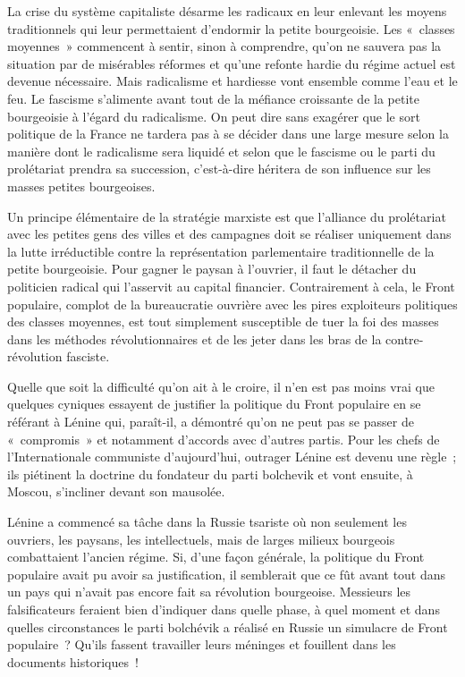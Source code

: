 \documentclass[french,twoside]{book} %
\begin{document}
La crise du système capitaliste désarme les radicaux en leur enlevant les moyens traditionnels qui leur permettaient d’endormir la petite bourgeoisie. Les « classes moyennes » commencent à sentir, sinon à comprendre, qu’on ne sauvera pas la situation par de misérables  réformes et qu’une refonte hardie du régime actuel est devenue nécessaire. Mais radicalisme et hardiesse vont ensemble comme l’eau et le feu. Le fascisme s’alimente avant tout de la méfiance croissante de la petite bourgeoisie à l’égard du radicalisme. On peut dire sans exagérer que le sort politique de la France ne tardera pas à se décider dans une large mesure selon la manière dont le radicalisme sera liquidé et selon que le fascisme ou le parti du prolétariat prendra sa succession, c’est-à-dire héritera de son influence sur les masses petites bourgeoises.\par
Un principe élémentaire de la stratégie marxiste est que l’alliance du prolétariat avec les petites gens des villes et des campagnes doit se réaliser uniquement dans la lutte irréductible contre la représentation parlementaire traditionnelle de la petite bourgeoisie. Pour gagner le paysan à l’ouvrier, il faut le détacher du politicien radical qui l’asservit au capital financier. Contrairement à cela, le Front populaire, complot de la bureaucratie ouvrière avec les pires exploiteurs politiques des classes moyennes, est tout simplement susceptible de tuer la foi des masses dans les méthodes révolutionnaires et de les jeter dans les bras de la contre-révolution fasciste.\par
Quelle que soit la difficulté qu’on ait à le croire, il n’en est pas moins vrai que quelques cyniques essayent de justifier la politique du Front populaire en se référant à Lénine qui, paraît-il, a démontré qu’on ne peut pas se passer de « compromis » et notamment d’accords avec d’autres partis. Pour les chefs de l’Internationale communiste d’aujourd’hui, outrager Lénine est devenu une règle ; ils piétinent la doctrine du fondateur du parti bolchevik et vont ensuite, à Moscou, s’incliner devant son mausolée.\par
Lénine a commencé sa tâche dans la Russie tsariste où non seulement les ouvriers, les paysans, les intellectuels,  mais de larges milieux bourgeois combattaient l’ancien régime. Si, d’une façon générale, la politique du Front populaire avait pu avoir sa justification, il semblerait que ce fût avant tout dans un pays qui n’avait pas encore fait sa révolution bourgeoise. Messieurs les falsificateurs feraient bien d’indiquer dans quelle phase, à quel moment et dans quelles circonstances le parti bolchévik a réalisé en Russie un simulacre de Front populaire ? Qu’ils fassent travailler leurs méninges et fouillent dans les documents historiques !\par
\end{document}
